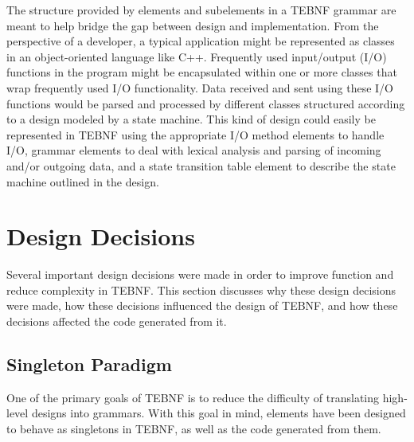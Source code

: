 \indent
The structure provided by elements and subelements in a TEBNF grammar are meant to help bridge the gap between design and implementation.  From the perspective of a developer, a typical application might be represented as classes in an object-oriented language like C++.  Frequently used input/output (I/O) functions in the program might be encapsulated within one or more classes that wrap frequently used I/O functionality.  Data received and sent using these I/O functions would be parsed and processed by different classes structured according to a design modeled by a state machine.  This kind of design could easily be represented in TEBNF using the appropriate I/O method elements to handle I/O, grammar elements to deal with lexical analysis and parsing of incoming and/or outgoing data, and a state transition table element to describe the state machine outlined in the design.

\section{Design Decisions}
Several important design decisions were made in order to improve function and reduce complexity in TEBNF.  This section discusses why these design decisions were made, how these decisions influenced the design of TEBNF, and how these decisions affected the code generated from it.

\subsection{Singleton Paradigm}
One of the primary goals of TEBNF is to reduce the difficulty of translating high-level designs into grammars.  With this goal in mind, elements have been designed to behave as singletons in TEBNF, as well as the code generated from them.

